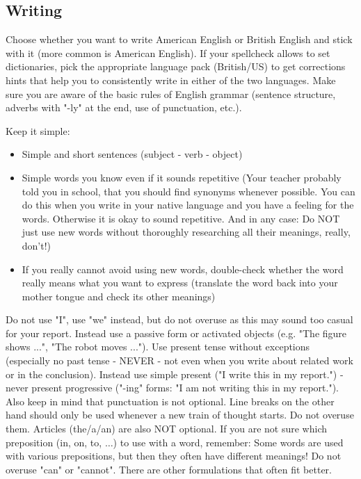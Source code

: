 \subsection{Writing}

Choose whether you want to write American English or British English and stick with it (more common is American English). If your spellcheck allows to set dictionaries, pick the appropriate language pack (British/US) to get corrections hints that help you to consistently write in either of the two languages.
Make sure you are aware of the basic rules of English grammar (sentence structure, adverbs with "-ly" at the end, use of punctuation, etc.).

Keep it simple:

\begin{itemize}
	\item Simple and short sentences (subject - verb - object)
	\item Simple words you know even if it sounds repetitive (Your teacher probably told you in school, that you should find synonyms whenever possible. You can do this when you write in your native language and you have a feeling for the words. Otherwise it is okay to sound repetitive. And in any case: Do NOT just use new words without thoroughly researching all their meanings, really, don't!)
	\item If you really cannot avoid using new words, double-check whether the word really means what you want to express (translate the word back into your mother tongue and check its other meanings)
\end{itemize}

Do not use "I", use "we" instead, but do not overuse as this may sound too casual for your report. Instead use a passive form or activated objects (e.g. "The figure shows ...", "The robot moves ..."). Use present tense without exceptions (especially no past tense - NEVER - not even when you write about related work or in the conclusion). Instead use simple present ("I write this in my report.") - never present progressive ("-ing" forms: "I am not writing this in my report."). Also keep in mind that punctuation is not optional. Line breaks on the other hand should only be used whenever a new train of thought starts. Do not overuse them. Articles (the/a/an) are also NOT optional. If you are not sure which preposition (in, on, to, $\ldots$) to use with a word, remember: Some words are used with various prepositions, but then they often have different meanings! Do not overuse "can" or "cannot". There are other formulations that often fit better.

